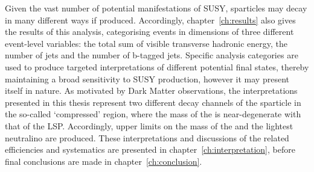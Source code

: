 Given the vast number of potential manifestations of SUSY, sparticles may
decay in many different ways if produced. Accordingly, chapter~\ref{ch:results}
also gives the results of this analysis, categorising events in dimensions
of three different event-level variables: the total sum of visible transverse
hadronic energy, the number of jets and the number of b-tagged jets.
Specific analysis categories are used to produce targeted
interpretations of different potential final states, thereby maintaining a broad
sensitivity to SUSY production, however it may present itself in nature. As
motivated by Dark Matter observations, the interpretations presented in this
thesis represent two different decay channels of the \sTop
sparticle in the so-called `compressed' region, where the mass of the \sTop is
near-degenerate with that of the LSP. Accordingly, upper limits on the mass of
the \sTop and the lightest neutralino are produced. These interpretations
and discussions of the related efficiencies and systematics are presented in
chapter~\ref{ch:interpretation}, before final conclusions are made in
chapter~\ref{ch:conclusion}.

